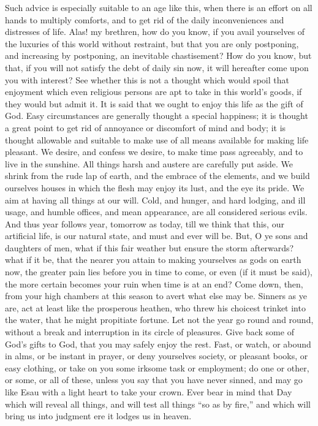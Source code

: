 Such advice is especially suitable to an age like this, when there is
an effort on all hands to multiply comforts, and to get rid of the daily
inconveniences and distresses of life. Alas! my brethren, how do you
know, if you avail yourselves of the luxuries of this world without
restraint, but that you are only postponing, and increasing by
postponing, an inevitable chastisement? How do you know, but that, if
you will not satisfy the debt of daily sin now, it will hereafter come
upon you with interest? See whether this is not a thought which would
spoil that enjoyment which even religious persons are apt to take in
this world's goods, if they would but admit it. It is said that we ought
to enjoy this life as the gift of God. Easy circumstances are generally
thought a special happiness; it is thought a great point to get rid of
annoyance or discomfort of mind and body; it is thought allowable and
suitable to make use of all means available for making life pleasant. We
desire, and confess we desire, to make time pass agreeably, and to live
in the sunshine. All things harsh and austere are carefully put aside.
We shrink from the rude lap of earth, and the embrace of the elements,
and we build ourselves houses in which the flesh may enjoy its lust, and
the eye its pride. We aim at having all things at our will. Cold, and
hunger, and hard lodging, and ill usage, and humble offices, and mean
appearance, are all considered serious evils. And thus year follows
year, tomorrow as today, till we think that this, our artificial life,
is our natural state, and must and ever will be. But, O ye sons and
daughters of men, what if this fair weather but ensure the storm
afterwards? what if it be, that the nearer you attain to making
yourselves as gods on earth now, the greater pain lies before you in
time to come, or even (if it must be said), the more certain becomes
your ruin when time is at an end? Come down, then, from your high
chambers at this season to avert what else may be. Sinners as ye are,
act at least like the prosperous heathen, who threw his choicest trinket
into the water, that he might propitiate fortune. Let not the year go
round and round, without a break and interruption in its circle of
pleasures. Give back some of God's gifts to God, that you may safely
enjoy the rest. Fast, or watch, or abound in alms, or be instant in
prayer, or deny yourselves society, or pleasant books, or easy clothing,
or take on you some irksome task or employment; do one or other, or
some, or all of these, unless you say that you have never sinned, and
may go like Esau with a light heart to take your crown. Ever bear in
mind that Day which will reveal all things, and will test all things
``so as by fire,'' and which will bring us into judgment ere it
lodges us in heaven.

